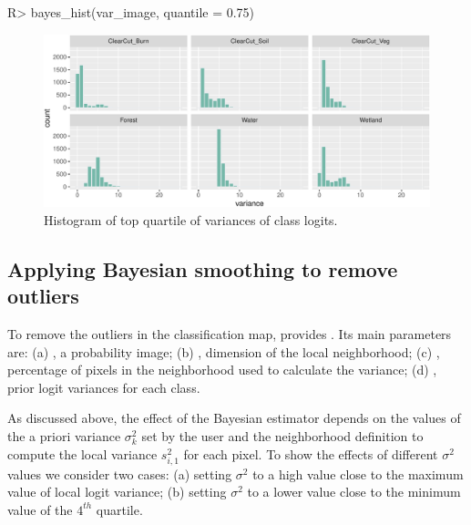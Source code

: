 \documentclass[
  shortnames]{jss}
\begin{document}
\begin{CodeChunk}
\begin{CodeInput}
R> bayes_hist(var_image, quantile = 0.75)
\end{CodeInput}
\begin{figure}[h]

{\centering \includegraphics{Bayesian_smoothing_JSS_files/figure-latex/vhist-1} 

}

\caption[Histogram of top quartile of variances of class logits]{Histogram of top quartile of variances of class logits.}\label{fig:vhist}
\end{figure}
\end{CodeChunk}

\hypertarget{applying-bayesian-smoothing-to-remove-outliers}{%
\subsection{Applying Bayesian smoothing to remove outliers}\label{applying-bayesian-smoothing-to-remove-outliers}}

To remove the outliers in the classification map,  provides . Its main parameters are: (a) , a probability image; (b) , dimension of the local neighborhood; (c) , percentage of pixels in the neighborhood used to calculate the variance; (d) , prior logit variances for each class.

As discussed above, the effect of the Bayesian estimator depends on the values of the a priori variance \(\sigma^2_{k}\) set by the user and the neighborhood definition to compute the local variance \(s^2_{i,1}\) for each pixel. To show the effects of different \(\sigma^2\) values we consider two cases: (a) setting \(\sigma^2\) to a high value close to the maximum value of local logit variance; (b) setting \(\sigma^2\) to a lower value close to the minimum value of the \(4^{th}\) quartile.
\end{document}
